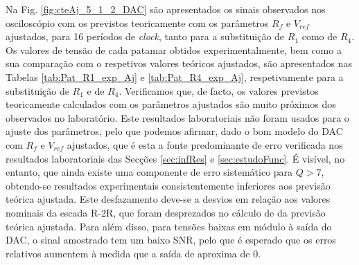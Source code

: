 \documentclass[a4paper, oneside]{article}
\begin{document}
Na Fig. \ref{fig:cteAj_5_1_2_DAC} são apresentados os sinais observados nos osciloscópio com os previstos teoricamente com os parâmetros $R_f$ e $V_{ref}$ ajustados, para 16 períodos de \textit{clock}, tanto para a substituição de $R_1$ como de $R_4$. Os valores de tensão de cada patamar obtidos experimentalmente, bem como a sua comparação com o respetivos valores teóricos ajustados, são apresentados nas Tabelas \ref{tab:Pat_R1_exp_Aj} e \ref{tab:Pat_R4_exp_Aj}, respetivamente para a substituição de $R_1$ e de $R_4$. Verificamos que, de facto, os valores previstos teoricamente calculados com os parâmetros ajustados são muito próximos dos observados no laboratório. Este resultados laboratoriais não foram usados para o ajuste dos parâmetros, pelo que podemos afirmar, dado o bom modelo do DAC com $R_f$ e $V_{ref}$ ajustados, que é esta a fonte predominante de erro verificada nos resultados laboratoriais das Secções \ref{sec:infRes} e \ref{sec:estudoFunc}. É visível, no entanto, que ainda existe uma componente de erro sistemático para $Q>7$, obtendo-se resultados experimentais consistentemente inferiores aos previsão teórica ajustada. Este desfazamento deve-se a desvios em relação aos valores nominais da escada R-2R, que foram desprezados no cálculo de da previsão teórica ajustada. Para além disso, para tensões baixas em módulo à saída do DAC, o sinal amostrado tem um baixo SNR, pelo que é esperado que os erros relativos aumentem à medida que a saída de aproxima de 0.
\end{document}
